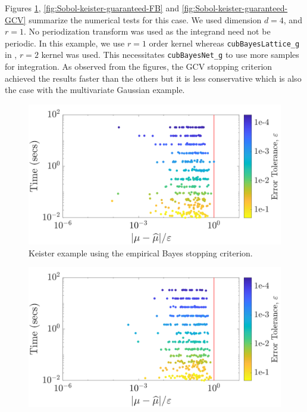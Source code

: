 \documentclass[graybox,footinfo]{svmult}
\newcommand{\code}[1]{\texttt{#1}}
\begin{document}
{{{{{{Figures \ref{fig:Sobol-keister-guaranteed-MLE}, \ref{fig:Sobol-keister-guaranteed-FB} and \ref{fig:Sobol-keister-guaranteed-GCV} summarize the numerical tests for this case. We used  dimension $d=4$, and $r=1$.  No periodization transform was used as the integrand need not be periodic. 
In this example, we use $r=1$ order kernel whereas \code{cubBayesLattice\_g} in \cite{RatHic19a}, $r=2$ kernel was used. This necessitates \code{cubBayesNet\_g} to use more samples for integration.
As observed from the figures, the GCV stopping criterion achieved the results faster than the others but it is less conservative which is also the case with the multivariate Gaussian example.

\begin{figure}
\centering
\includegraphics[width=0.95\linewidth]{"figures/Sobol/Sobol_Keister_guaranteed_time_MLE__d4_r1_2019-Sep-1"}
\caption[Sobol: Keister guaranteed: MLE]{Keister example using the empirical Bayes stopping criterion.}
\label{fig:Sobol-keister-guaranteed-MLE}
\end{figure}
\begin{figure}
\centering
\includegraphics[width=0.95\linewidth]{"figures/Sobol/Sobol_Keister_guaranteed_time_full__d4_r1_2019-Sep-1"}

\end{figure}}}}}}}
\end{document}
